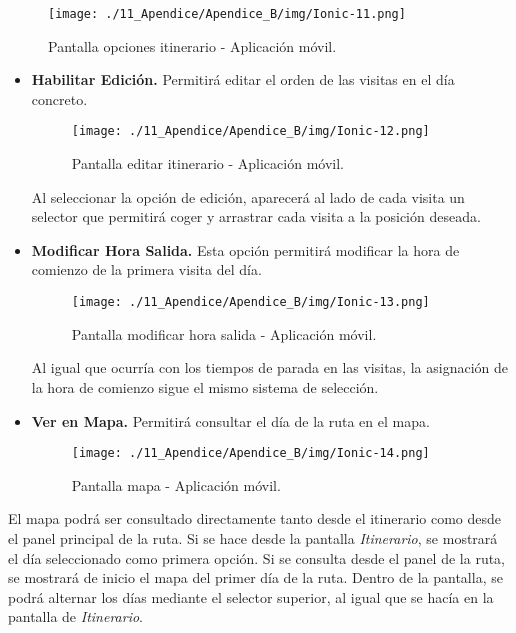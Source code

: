 \begin{figure}[H]
\centering
\texttt{[image: ./11\_Apendice/Apendice\_B/img/Ionic-11.png]}
\caption{Pantalla opciones itinerario - Aplicación móvil.}
\end{figure}


\begin{itemize}
	\item \textbf{Habilitar Edición. }Permitirá editar el orden de las visitas en el día concreto.
	
	\begin{figure}[H]
\centering
\texttt{[image: ./11\_Apendice/Apendice\_B/img/Ionic-12.png]}
\caption{Pantalla editar itinerario - Aplicación móvil.}
\end{figure}

	Al seleccionar la opción de edición, aparecerá al lado de cada visita un selector que permitirá coger y arrastrar cada visita a la posición deseada.	
	
	\item \textbf{Modificar Hora Salida. } Esta opción permitirá modificar la hora de comienzo de la primera visita del día.
	
		\begin{figure}[H]
\centering
\texttt{[image: ./11\_Apendice/Apendice\_B/img/Ionic-13.png]}
\caption{Pantalla modificar hora salida - Aplicación móvil.}
\end{figure}

	Al igual que ocurría con los tiempos de parada en las visitas, la asignación de la hora de comienzo sigue el mismo sistema de selección.
	
	\item \textbf{Ver en Mapa. }Permitirá consultar el día de la ruta en el mapa.
	
	
	
\begin{figure}[H]
\centering
\texttt{[image: ./11\_Apendice/Apendice\_B/img/Ionic-14.png]}
\caption{Pantalla mapa - Aplicación móvil.}
\end{figure}
\end{itemize}

El mapa podrá ser consultado directamente tanto desde el itinerario como desde el panel principal de la ruta. Si se hace desde la pantalla \textit{Itinerario}, se mostrará el día seleccionado como primera opción. Si se consulta desde el panel de la ruta, se mostrará de inicio el mapa del primer día de la ruta. Dentro de la pantalla, se podrá alternar los días mediante el selector superior, al igual que se hacía en la pantalla de \textit{Itinerario}.
	
